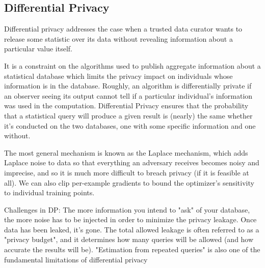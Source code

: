 \documentclass[12pt]{article}
\begin{document}
\subsection{Differential Privacy}
\par Differential privacy addresses the case when a trusted data curator wants to release some statistic over its data without revealing information about a particular value itself.
\par It is a constraint on the algorithms used to publish aggregate information about a statistical database which limits the privacy impact on individuals whose information is in the database. Roughly, an algorithm is differentially private if an observer seeing its output cannot tell if a particular individual's information was used in the computation. Differential Privacy ensures that the probability that a statistical query will produce a given result is (nearly) the same whether it's conducted on the two databases, one with some specific information and one without.
\par The most general mechanism is known as the Laplace mechanism, which adds Laplace noise to data so that everything an adversary receives becomes noisy and imprecise, and so it is much more difficult to breach privacy (if it is feasible at all). We can also clip per-example gradients to bound the optimizer's sensitivity to individual training points.
\par Challenges in DP: The more information you intend to "ask" of your database, the more noise has to be injected in order to minimize the privacy leakage. Once data has been leaked, it's gone. The total allowed leakage is often referred to as a "privacy budget", and it determines how many queries will be allowed (and how accurate the results will be). "Estimation from repeated queries" is also one of the fundamental limitations of differential privacy 
\end{document}
